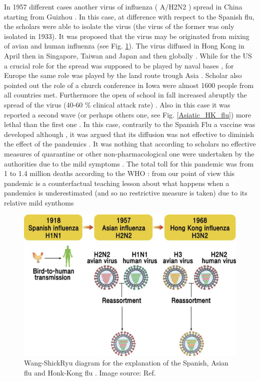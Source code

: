 \documentclass[
12pt, %
a4paper, %
oneside, %
headinclude,footinclude, %
BCOR5mm, %
]{scrartcl}
\begin{document}
In 1957 different cases another virus of influenza ( A/H2N2 ) spread in China starting from Guizhou \cite{strahan1994oriental} . In this case, at difference with respect to the Spanish flu, the scholars were able to isolate the virus (the virus of the former was only isolated in 1933). It was proposed that the virus may be originated from mixing of avian and human influenza (see Fig. \ref{Mixing_Flu}). The virus diffused in Hong Kong in April then in Singapore, Taiwan and Japan and then globally \cite{saunders2016reviewing} . While for the US a crucial role for the spread was supposed to be played by naval  bases \cite{henderson2016development,saunders2016reviewing}, for Europe the same role was played by the  land route trough Asia \cite{langmuir1961epidemiology,saunders2016reviewing}. Scholar also pointed out the role of a church conference in Iowa \cite{payne1958some} were almost 1600 people from all countries met. Furthermore the open of school in fall increased abruptly the spread of the virus (40-60 \% clinical attack rate) \cite{henderson2009public,saunders2016reviewing}. Also in this case it was reported a second wave (or perhaps others one, see Fig. \ref{Asiatic_HK_flu}) more lethal than the first one \cite{ebasianflu} . In this case, contrarily to the Spanish Flu a vaccine was developed although \cite{henderson2009public}, it was argued that its diffusion was not effective to diminish the effect of the pandemics \cite{jensen1958influenza}. It was nothing that according to scholars \cite{trotter1959asian} no effective measures of quarantine or other non-pharmacological one were undertaken by the authorities \cite{trotter1959asian} due to the mild symptoms \cite{saunders2016reviewing}. The total toll for this pandemic was from 1 to 1.4 million deaths according to the WHO \cite{who_influenza}: from our point of view this pandemic is a counterfactual teaching lesson about what happens when a pandemics is underestimated (and so no restrictive measure is taken)  due to its relative  mild synthoms 

\begin{figure}[h]
 \centering
 \includegraphics[width=0.8\linewidth]{Figures/Mixing_Flu.jpg} 
 \caption{Wang-ShickRyu diagram for the explanation of the Spanish, Asian flu and Honk-Kong flu .  Image source: Ref.  \cite{RYU2017195}}
 \label{Mixing_Flu}
\end{figure}
\end{document}
